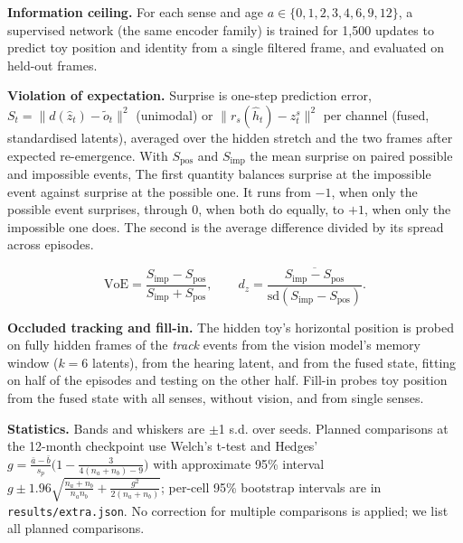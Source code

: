 \documentclass{article}
\begin{document}
\textbf{Information ceiling.} For each sense and age \(a\in\{0,1,2,3,4,6,9,12\}\), a supervised network (the same encoder family) is trained for 1,500 updates to predict toy position and identity from a single filtered frame, and evaluated on held-out frames.

\textbf{Violation of expectation.} Surprise is one-step prediction error, \(S_t=\lVert d(\hat z_t)-\tilde o_t\rVert^2\) (unimodal) or \(\lVert r_s(\hat h_t)-z^s_t\rVert^2\) per channel (fused, standardised latents), averaged over the hidden stretch and the two frames after expected re-emergence. With \(S_{\text{pos}}\) and \(S_{\text{imp}}\) the mean surprise on paired possible and impossible events,
The first quantity balances surprise at the impossible event against surprise at the possible one. It runs from \(-1\), when only the possible event surprises, through 0, when both do equally, to \(+1\), when only the impossible one does. The second is the average difference divided by its spread across episodes.

\begin{equation}\mathrm{VoE}=\frac{S_{\text{imp}}-S_{\text{pos}}}{S_{\text{imp}}+S_{\text{pos}}},\qquad d_z=\frac{\overline{S_{\text{imp}}-S_{\text{pos}}}}{\mathrm{sd}(S_{\text{imp}}-S_{\text{pos}})}.\end{equation}

\textbf{Occluded tracking and fill-in.} The hidden toy's horizontal position is probed on fully hidden frames of the \emph{track} events from the vision model's memory window (\(k=6\) latents), from the hearing latent, and from the fused state, fitting on half of the episodes and testing on the other half. Fill-in probes toy position from the fused state with all senses, without vision, and from single senses.

\textbf{Statistics.} Bands and whiskers are \ensuremath{\pm}1 s.d. over seeds. Planned comparisons at the 12-month checkpoint use Welch's t-test and Hedges' \(g=\frac{\bar a-\bar b}{s_p}\big(1-\frac{3}{4(n_a+n_b)-9}\big)\) with approximate 95\% interval \(g\pm1.96\sqrt{\frac{n_a+n_b}{n_an_b}+\frac{g^2}{2(n_a+n_b)}}\); per-cell 95\% bootstrap intervals are in \texttt{results/extra.json}. No correction for multiple comparisons is applied; we list all planned comparisons.
\end{document}
